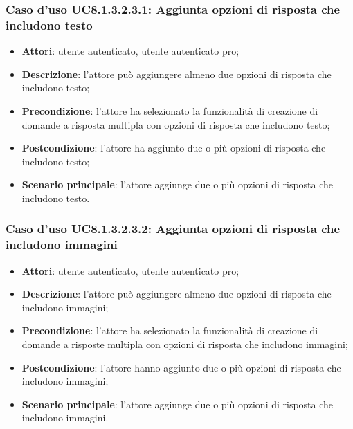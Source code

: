 \subsubsection{Caso d'uso UC8.1.3.2.3.1: Aggiunta opzioni di risposta che includono testo}
	\begin{itemize}
		\item
			\textbf{Attori}: utente autenticato, utente autenticato pro;
		\item		
			\textbf{Descrizione}: l'attore può aggiungere almeno due opzioni di risposta che includono testo;
		\item
			\textbf{Precondizione}: l'attore ha selezionato la funzionalità di creazione di domande a risposta multipla con opzioni di risposta che includono testo; 
		\item
			\textbf{Postcondizione}: l'attore ha aggiunto due o più opzioni di risposta che includono testo;
		\item
			\textbf{Scenario principale}: l'attore aggiunge due o più opzioni di risposta che includono testo. 			
	\end{itemize}	
	
\subsubsection{Caso d'uso UC8.1.3.2.3.2: Aggiunta opzioni di risposta che includono immagini}
	\begin{itemize}
		\item
			\textbf{Attori}: utente autenticato, utente autenticato pro;
		\item		
			\textbf{Descrizione}: l'attore può aggiungere almeno due opzioni di risposta che includono immagini;
		\item
			\textbf{Precondizione}: l'attore ha selezionato la funzionalità di creazione di domande a risposte multipla con opzioni di risposta che includono immagini; 
		\item
			\textbf{Postcondizione}: l'attore hanno aggiunto due o più opzioni di risposta che includono immagini;
		\item
			\textbf{Scenario principale}: l'attore aggiunge due o più opzioni di risposta che includono immagini. 			
	\end{itemize}
	
